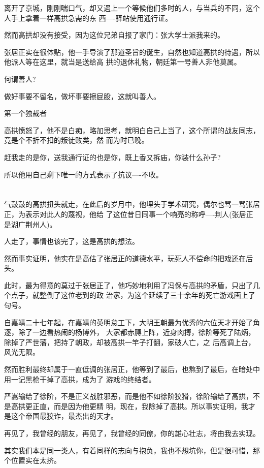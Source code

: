 \documentclass[11pt,a4paper,onecolumn]{article}
\begin{document}
离开了京城，刚刚喘口气，却又遇上一个等候他们多时的人，与当兵的不同，这个人手上拿着一样高拱急需的东
西----驿站使用通行证。

然而高拱却没有接受，因为这位兄弟自报了家门：张大学士派我来的。

张居正实在很体贴，他一手导演了那道圣旨的诞生，自然也知道高拱的待遇，所以他派人等在这里，就当是送给高
拱的退休礼物，朝廷第一号善人非他莫属。

何谓善人?

做好事要不留名，做坏事要擦屁股，这就叫善人。

第一个独裁者

高拱愤怒了，他不是白痴，略加思考，就明白自己上当了，这个所谓的战友同志，竟是个不折不扣的叛徒败类，然
而为时已晚。

赶我走的是你，送我通行证的也是你，既上香又拆庙，你装什么孙子?

所以他用自己剩下唯一的方式表示了抗议----不收。

\section[\thesection]{}

气鼓鼓的高拱扭头就走，在此后的岁月中，他埋头于学术研究，偶尔也骂一骂张居正，为表示对此人的蔑视，他给
了这位昔日同事一个响亮的称呼----荆人(张居正是湖广荆州人)。

人走了，事情也该完了，这是高拱的想法。

然而事实证明，他实在是高估了张居正的道德水平，玩死人不偿命的把戏还在后头。

此时，最为得意的莫过于张居正了，他巧妙地利用了冯保与高拱的矛盾，只出了几个点子，就整倒了这位老到的政
治家，为这个延续了三十余年的死亡游戏画上了句号。

自嘉靖二十七年起，在嘉靖的英明怠工下，大明王朝最为优秀的六位天才开始了角逐，除了一边看热闹的杨博外，
大家都赤膊上阵，近身肉搏，徐阶等死了陆炳，除掉了严世藩，把持了朝政，却被高拱一竿子打翻，家破人亡，之
后高调上台，风光无限。

然而胜利最终却属于一直低调的张居正，他等到了最后，也熬到了最后，在暗处中用一记黑枪干掉了高拱，成为了
游戏的终结者。

严嵩输给了徐阶，不是正义战胜邪恶，而是他不如徐阶狡猾，徐阶输给了高拱，不是高拱更正直，而是因为他更精
明，现在，我除掉了高拱。所以事实证明，我才是这个帝国最狡诈，最杰出的天才。

再见了，我曾经的朋友，再见了，我曾经的同僚，你的雄心壮志，将由我去实现。

其实我们本是同一类人，有着同样的志向与抱负，我也不想坑你，但是很可惜，那个位置实在太挤。
\end{document}

